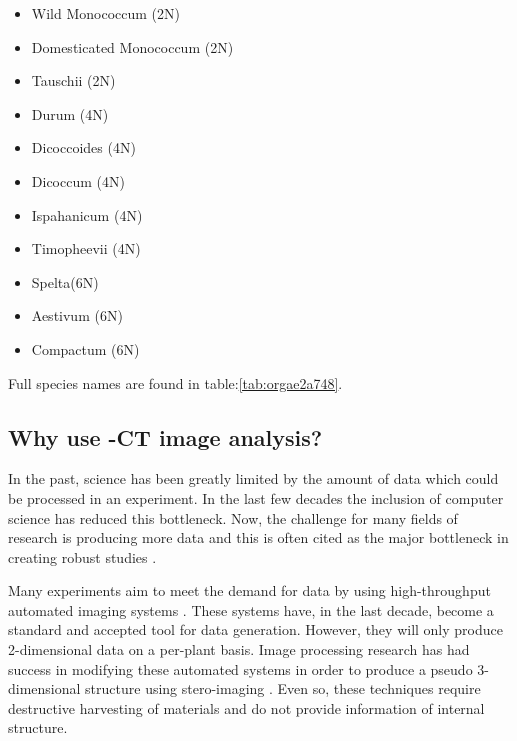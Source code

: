 \documentclass[11pt]{report}
\begin{document}
\begin{multicols}{3}

  \begin{itemize}
  \item Wild Monococcum (2N)
  \item Domesticated Monococcum (2N)
  \item Tauschii (2N)
  \end{itemize}

  \columnbreak

  \begin{itemize}
  \item Durum (4N)
  \item Dicoccoides (4N)
  \item Dicoccum (4N)
  \item Ispahanicum (4N)
  \item Timopheevii (4N)
  \end{itemize}

  \columnbreak

  \begin{itemize}
  \item Spelta(6N)
  \item Aestivum (6N)
  \item Compactum (6N)
  \end{itemize}

\end{multicols}
Full species names are found in table:\ref{tab:orgae2a748}.

\subsection{Why use \textmu{}-CT image analysis?}
\label{sec:orgef71fd3}
In the past, science has been greatly limited by the amount of data which could be processed in an experiment. In the last few decades the inclusion of computer science has reduced this bottleneck. Now, the challenge for many fields of research is producing more data and this is often cited as the major bottleneck in creating robust studies \cite{Furbank2011}.

Many experiments aim to meet the demand for data by using high-throughput automated imaging systems \cite{Naumann2007,Prasanna2013,Humplik2015}. These systems have, in the last decade, become a standard and accepted tool for data generation. However, they will only produce 2-dimensional data on a per-plant basis. Image processing research has had success in modifying these automated systems in order to produce a pseudo 3-dimensional structure using stero-imaging \cite{Roussel2016}. Even so, these techniques require destructive harvesting of materials and do not provide information of internal structure.
\end{document}

